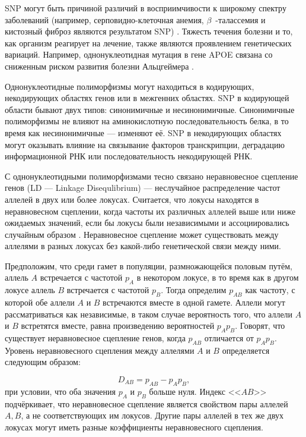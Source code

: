 SNP могут быть причиной различий в восприимчивости к широкому спектру заболеваний (например, серповидно-клеточная анемия, $\beta$~-талассемия и кистозный фиброз являются результатом SNP) \autocite{INGRAM1956, Chang1979, Reiss1993}. Тяжесть течения болезни и то, как организм реагирует на лечение, также являются проявлением генетических вариаций. Например, однонуклеотидная мутация в гене APOE связана со сниженным риском развития болезни Альцгеймера \autocite{Wolf2013}.

Однонуклеотидные полиморфизмы могут находиться в кодирующих, некодирующих областях генов или в межгенних областях. SNP в кодирующей области бывают двух типов: синонимичные и несинонимичные. Синонимичные полиморфизмы не влияют на аминокислотную последовательность белка, в то время как несинонимичные --- изменяют её. SNP в некодирующих областях могут оказывать влияние на связывание факторов транскрипции, деградацию информационной РНК или последовательность некодирующей РНК. 


С однонуклеотидными полиморфизмами тесно связано неравновесное сцепление генов (LD --- Linkage Disequlibrium) --- неслучайное распределение частот аллелей в двух или более локусах. Считается, что локусы находятся в неравновесном сцеплении, когда частоты их различных аллелей выше или ниже ожидаемых значений, если бы локусы были независимыми и ассоциировались случайным образом \autocite{Slatkin2008}. Неравновесное сцепление может существовать между аллелями в разных локусах без какой-либо генетической связи между ними. 

Предположим, что среди гамет в популяции, размножающейся половым путём, аллель $A$ встречается с частотой $p_{A}$ в некотором локусе, в то время как в другом локусе аллель $B$ встречается с частотой $p_{B}$. Тогда определим $p_{AB}$ как частоту, с которой обе аллели $A$ и $B$ встречаются вместе в одной гамете. Аллели могут рассматриваться как независимые, в таком случае вероятность того, что аллели $A$ и $B$ встретятся вместе, равна произведению вероятностей $p_{A}p_{B}$. Говорят, что существует неравновесное сцепление генов, когда $p_{AB}$ отличается от $p_{A}p_{B}$. Уровень неравновесного сцепления между аллелями $A$ и $B$ определяется следующим образом: 

\begin{equation}
\label{eq:LD}
D_{AB} = p_{AB} - p_{A}p_{B},
\end{equation}
при условии, что оба значения $p_{A}$ и $p_{B}$ больше нуля. Индекс <<$AB$>> подчёркивает, что неравновесное сцепление является свойством пары аллелей ${A, B}$, а не соответствующих им локусов. Другие пары аллелей в тех же двух локусах могут иметь разные коэффициенты неравновесного сцепления.

